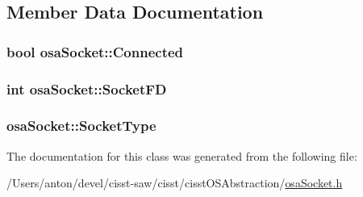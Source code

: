 \subsection{Member Data Documentation}
\hypertarget{classosa_socket_ab44f88953d932cd97a9c772155d21e37}{}
\subsubsection[{Connected}]{\setlength{\rightskip}{0pt plus 5cm}bool osa\+Socket\+::\+Connected\hspace{0.3cm}{\ttfamily [protected]}}\label{classosa_socket_ab44f88953d932cd97a9c772155d21e37}
\hypertarget{classosa_socket_aa2b18a862994f6498868186a44d28793}{}
\subsubsection[{Socket\+F\+D}]{\setlength{\rightskip}{0pt plus 5cm}int osa\+Socket\+::\+Socket\+F\+D\hspace{0.3cm}{\ttfamily [protected]}}\label{classosa_socket_aa2b18a862994f6498868186a44d28793}
\hypertarget{classosa_socket_ac893ce4c18feac9b627df95993156482}{}
\subsubsection[{Socket\+Type}]{ osa\+Socket\+::\+Socket\+Type\hspace{0.3cm}{\ttfamily [protected]}}\label{classosa_socket_ac893ce4c18feac9b627df95993156482}


The documentation for this class was generated from the following file\+:\begin{DoxyCompactItemize}
\item 
/\+Users/anton/devel/cisst-\/saw/cisst/cisst\+O\+S\+Abstraction/\hyperlink{osa_socket_8h}{osa\+Socket.\+h}\end{DoxyCompactItemize}
